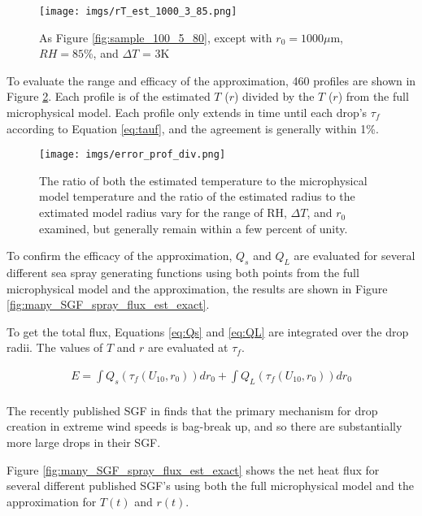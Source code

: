\documentclass[10pt,a4paper]{article}
\begin{document}
\begin{figure}[h!]
    \centering
        \texttt{[image: imgs/rT\_est\_1000\_3\_85.png]}        
       \caption{As Figure \ref{fig:sample_100_5_80}, except with $r_0 = 1000\mu$m, $RH = 85$\%, and $\Delta T$ = 3K }
        \label{fig:sample_1000_3_85} 
\end{figure}

 
To evaluate the range and efficacy of the approximation, 460 profiles are shown in Figure \ref{fig:error_prof_div}. Each profile is of the estimated $T$ ($r$) divided by the $T$ ($r$) from the full microphysical model. Each profile only extends in time until each drop's $\tau_f$ according to Equation \ref{eq:tauf}, and the agreement is generally within 1\%. 

\begin{figure}[h!]
    \centering
        \texttt{[image: imgs/error\_prof\_div.png]}        
       \caption{The ratio of both the estimated temperature to the microphysical model temperature and the ratio of the estimated radius to the extimated model radius vary for the range of RH, $\Delta T$, and $r_0$ examined, but generally remain within a few percent of unity. \label{fig:error_prof_div}}
\end{figure}
 
To confirm the efficacy of the approximation, $Q_s$ and $Q_L$ are evaluated for several different sea spray generating functions using both points from the full microphysical model and the approximation, the results are shown in Figure \ref{fig:many_SGF_spray_flux_est_exact}.

To get the total flux, Equations \ref{eq:Qs} and \ref{eq:QL} are integrated over the drop radii. The values of $T$ and $r$ are evaluated at $\tau_f$. 

\begin{align}
E = \int Q_s(\tau_f(U_{10},r_0)) dr_0 + \int Q_L(\tau_f(U_{10},r_0)) dr_0\\
\end{align}

The recently published SGF in \citet{Troitskaya2018} finds that the primary mechanism for drop creation in extreme wind speeds is bag-break up, and so there are substantially more large drops in their SGF. 

Figure \ref{fig:many_SGF_spray_flux_est_exact} shows the net heat flux for several different published SGF's using both the full microphysical model and the approximation for $T(t)$ and $r(t)$. 
\end{document}
